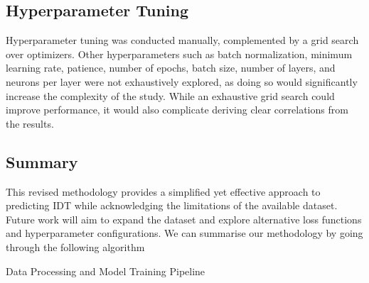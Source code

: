 \documentclass[12pt]{report}
\begin{document}
\subsection{Hyperparameter Tuning}

Hyperparameter tuning was conducted manually, complemented by a grid search over optimizers. Other hyperparameters such as batch normalization, minimum learning rate, patience, number of epochs, batch size, number of layers, and neurons per layer were not exhaustively explored, as doing so would significantly increase the complexity of the study. While an exhaustive grid search could improve performance, it would also complicate deriving clear correlations from the results.

\subsection{Summary}

This revised methodology provides a simplified yet effective approach to predicting IDT while acknowledging the limitations of the available dataset. Future work will aim to expand the dataset and explore alternative loss functions and hyperparameter configurations. We can summarise our methodology by going through the following algorithm

\begin{algorithm}[H]
\SetAlgoLined
{}



 \caption{Data Processing and Model Training Pipeline}
\end{algorithm}
\end{document}
